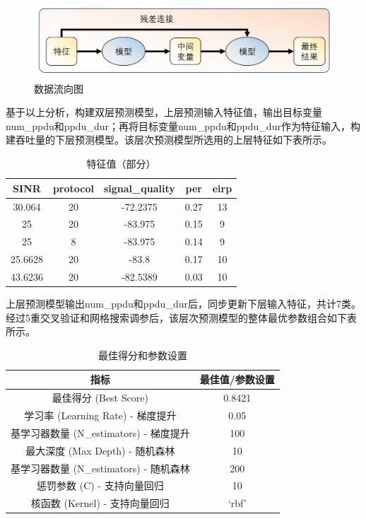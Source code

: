 \begin{figure}[H]
	\centering
	\includegraphics[width=0.7\linewidth]{figures/问题三流程}
	\caption{数据流向图}
	\label{fig:}
\end{figure}



基于以上分析，构建双层预测模型，上层预测输入特征值，输出目标变量num\_ppdu和ppdu\_dur；再将目标变量num\_ppdu和ppdu\_dur作为特征输入，构建吞吐量的下层预测模型。该层次预测模型所选用的上层特征如下表所示。

\begin{table}[H]
	\centering
	\caption{特征值（部分）}
	\begin{tabular}{ccccc} %
		\toprule
		SINR & protocol & signal\_quality &  per & eirp\\ 
		\midrule
		30.064 & 20 & -72.2375 &  0.27 & 13 \\
		25 & 20 & -83.975 &  0.15 & 9 \\
		25 & 8 & -83.975 &  0.14 & 9 \\
		25.6628 & 20 & -83.8 &  0.17 & 10 \\
		43.6236 & 20 & -82.5389 &  0.03 & 10 \\
		\bottomrule
	\end{tabular}
\end{table}

上层预测模型输出num\_ppdu和ppdu\_dur后，同步更新下层输入特征，共计7类。经过5重交叉验证和网格搜索调参后，该层次预测模型的整体最优参数组合如下表所示。


\begin{table}[H]
	\centering
	\caption{最佳得分和参数设置}
	\begin{tabular}{cc}
		\toprule
		指标 & 最佳值/参数设置 \\
		\midrule
		最佳得分 (Best Score) & 0.8421 \\
		学习率 (Learning Rate) - 梯度提升 & 0.05 \\
		基学习器数量 (N\_estimators) - 梯度提升 & 100 \\
		最大深度 (Max Depth) - 随机森林 & 10 \\
		基学习器数量 (N\_estimators) - 随机森林 & 200 \\
		惩罚参数 (C) - 支持向量回归 & 10 \\
		核函数 (Kernel) - 支持向量回归 & `rbf' \\
		\bottomrule
	\end{tabular}
\end{table}


